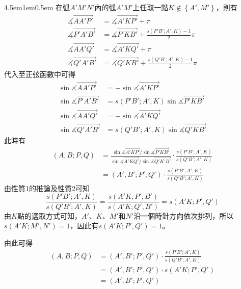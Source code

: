 \documentclass[12pt]{article}
\begin{document}
\begin{mybox}{4.5em}{1em}{0.5em}
    在弧$A'M'N'$內的弧$A'M'$上任取一點$K\notin\left\{A',M'\right\}$，則有
    \begin{align*}
        \measuredangle{\overrightarrow{AA'P'}}&=\measuredangle{\overrightarrow{A'KP'}}+\pi\\
        \measuredangle{\overrightarrow{P'A'B'}}&=\measuredangle{\overrightarrow{P'KB'}}+\frac{s\left(P'B';A',K\right)-1}{2}\pi\\
        \measuredangle{\overrightarrow{AA'Q'}}&=\measuredangle{\overrightarrow{A'KQ'}}+\pi\\
        \measuredangle{\overrightarrow{Q'A'B'}}&=\measuredangle{\overrightarrow{Q'KB'}}+\frac{s\left(Q'B';A',K\right)-1}{2}\pi
    \end{align*}
    代入至正弦函數中可得
    \begin{align*}
        \sin{\measuredangle{\overrightarrow{AA'P'}}}&=-\sin{\measuredangle{\overrightarrow{A'KP'}}}\\
        \sin{\measuredangle{\overrightarrow{P'A'B'}}}&=s\left(P'B';A',K\right)\sin{\measuredangle{\overrightarrow{P'KB'}}}\\
        \sin{\measuredangle{\overrightarrow{AA'Q'}}}&=-\sin{\measuredangle{\overrightarrow{A'KQ'}}}\\
        \sin{\measuredangle{\overrightarrow{Q'A'B'}}}&=s\left(Q'B';A',K\right)\sin{\measuredangle{\overrightarrow{Q'KB'}}}
    \end{align*}
    此時有
    \begin{align*}
        \left(A,B;P,Q\right)&=\frac{\sin{\measuredangle{\overrightarrow{A'KP'}}}/\sin{\measuredangle{\overrightarrow{P'KB'}}}}{\sin{\measuredangle{\overrightarrow{A'KQ'}}}/\sin{\measuredangle{\overrightarrow{Q'K'B'}}}}\cdot\frac{s\left(P'B';A',K\right)}{s\left(Q'B';A',K\right)}\\
        &=\left(A',B';P',Q'\right)\cdot\frac{s\left(P'B';A',K\right)}{s\left(Q'B';A',K\right)}
    \end{align*}
    由性質1的推論及性質2可知
    $$
        \frac{s\left(P'B';A',K\right)}{s\left(Q'B';A',K\right)}=\frac{s\left(A'K;P',B'\right)}{s\left(A'K;Q',B'\right)}=s\left(A'K;P',Q'\right)
    $$
    由$K$點的選取方式可知，$A'$、$K$、$M'$和$N'$沿一個時針方向依次排列，所以$s\left(A'K;M',N'\right)=1$，因此有$s\left(A'K;P',Q'\right)=1$。
    
    由此可得
    \begin{align*}
        \left(A,B;P,Q\right)&=\left(A',B';P',Q'\right)\cdot\frac{s\left(P'B';A',K\right)}{s\left(Q'B';A',K\right)}\\
        &=\left(A',B';P',Q'\right)\cdot s\left(A'K;P',Q'\right)\\
        &=\left(A',B';P',Q'\right)
    \end{align*}
\end{mybox}
\end{document}
